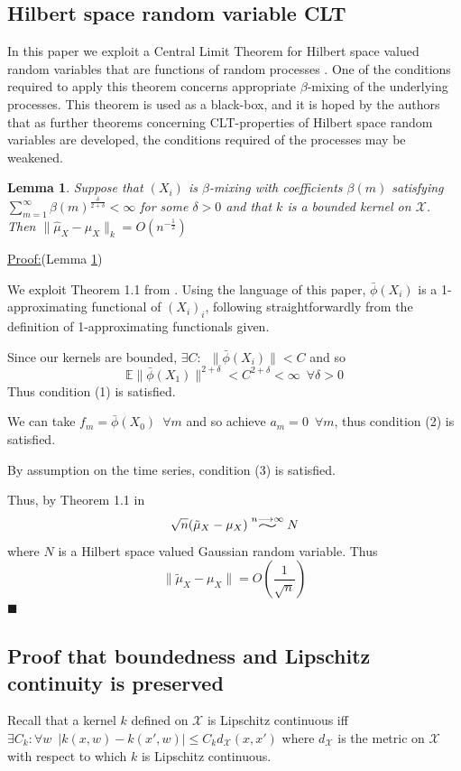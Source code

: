 \documentclass[]{article}
\newtheorem{lemma}{Lemma}
\newenvironment{claimproof}[1]{\par\noindent\underline{Proof:}\space#1}{\hfill $\blacksquare$}
\newcommand{\widesim}[2][1.5]{
  \mathrel{\overset{#2}{\scalebox{#1}[1]{$\sim$}}}}
\begin{document}
\subsection{Hilbert space random variable CLT}

In this paper we exploit a Central Limit Theorem for Hilbert space valued random variables that are functions of random processes \cite{dehling2015bootstrap}. One of the conditions required to apply this theorem concerns appropriate $\beta$-mixing of the underlying processes. This theorem is used as a black-box, and it is hoped by the authors that as further theorems concerning CLT-properties of Hilbert space random variables are developed, the conditions required of the processes may be weakened.

\begin{lemma}\label{lemma:hilbertCLT}
Suppose that $(X_i)$ is $\beta$-mixing with coefficients $\beta(m)$ satisfying $\sum_{m=1}^{\infty}\beta(m)^{\frac{\delta}{2+\delta}}<\infty$ for some $\delta > 0$ and that $k$ is a bounded kernel on $\mathcal{X}$. Then $\|\hat\mu_X - \mu_X\|_k = O(n^{-\frac{1}{2}})$

\end{lemma}

\begin{claimproof}(Lemma \ref{lemma:hilbertCLT})

We exploit Theorem 1.1 from \cite{dehling2015bootstrap}. Using the language of this paper, $\bar{\phi}(X_i)$ is a 1-approximating functional of $(X_i)_i$, following straightforwardly from the definition of 1-approximating functionals given. 

Since our kernels are bounded, $\exists C: \enspace \|\bar{\phi}(X_i)\| < C $ and so \[\mathbb{E}\|\bar{\phi}(X_1)\|^{2+\delta} <C^{2+\delta}< \infty \enspace \forall \delta>0\]
Thus condition (1) is satisfied.

We can take $f_m = \bar{\phi}(X_0)\enspace \forall m$ and so achieve $a_m= 0 \enspace \forall m$, thus condition (2) is satisfied.

By assumption on the time series, condition (3) is satisfied.

Thus, by Theorem 1.1 in \cite{dehling2015bootstrap}
\[\sqrt{n} (\tilde{\mu}_{X} - \mu_{X}) \widesim[2]{n\longrightarrow\infty} N\]
where $N$ is a Hilbert space valued Gaussian random variable. Thus 
\[\|\tilde{\mu}_{X} - \mu_{X}\| = O(\frac{1}{\sqrt{n}})\]
\end{claimproof}

\subsection{Proof that boundedness and Lipschitz continuity is preserved}\label{supp:bounded-and-lipschitz}
Recall that a kernel $k$ defined on $\mathcal{X}$ is Lipschitz continuous iff $\exists C_k : \forall w \enspace |k(x,w) - k(x',w)| \leq C_k d_\mathcal{X}(x,x')$ where $d_\mathcal{X}$ is the metric on $\mathcal{X}$ with respect to which $k$ is Lipschitz continuous.
\end{document}
